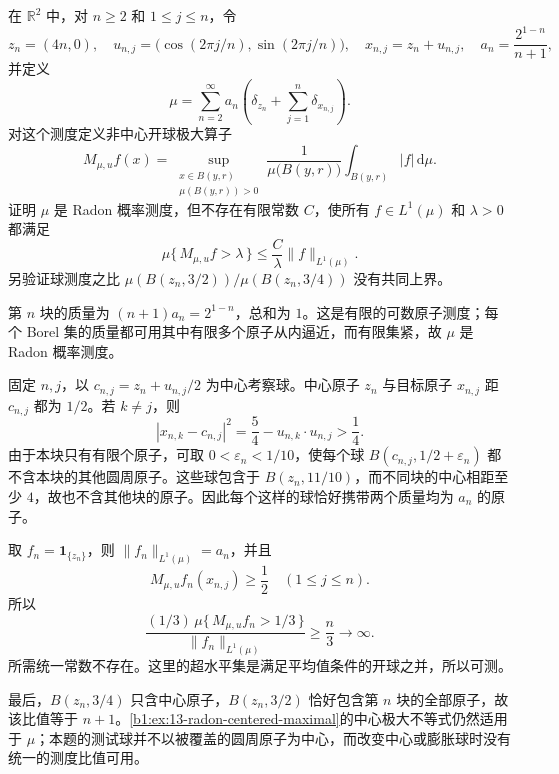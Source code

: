\begin{optionalexercise}\label{b1:ex:13-nondoubling-uncentered}
在 \(\mathbb R^2\) 中，对 \(n\ge2\) 和 \(1\le j\le n\)，令
\[
 z_n=(4n,0),\quad
 u_{n,j}=\bigl(\cos(2\pi j/n),\sin(2\pi j/n)\bigr),
 \quad x_{n,j}=z_n+u_{n,j},\quad
 a_n=\frac{2^{1-n}}{n+1},
\]
并定义
\[
 \mu=\sum_{n=2}^{\infty}a_n\left(\delta_{z_n}+\sum_{j=1}^n\delta_{x_{n,j}}\right).
\]
对这个测度定义非中心开球极大算子
\[
 M_{\mu,u}f(x)=\sup_{\substack{x\in B(y,r)\\\mu(B(y,r))>0}}
 \frac1{\mu\bigl(B(y,r)\bigr)}\int_{B(y,r)}|f|\,\mathrm d\mu.
\]
证明 \(\mu\) 是 Radon 概率测度，但不存在有限常数 \(C\)，使所有 \(f\in L^1(\mu)\) 和 \(\lambda>0\) 都满足
\[
 \mu\{\,M_{\mu,u}f>\lambda\,\}\le\frac C\lambda\|f\|_{L^1(\mu)}.
\]
另验证球测度之比 \(\mu(B(z_n,3/2))/\mu(B(z_n,3/4))\) 没有共同上界。
\end{optionalexercise}
\begin{solution}
第 \(n\) 块的质量为 \((n+1)a_n=2^{1-n}\)，总和为 \(1\)。这是有限的可数原子测度；每个 Borel 集的质量都可用其中有限多个原子从内逼近，而有限集紧，故 \(\mu\) 是 Radon 概率测度。

固定 \(n,j\)，以 \(c_{n,j}=z_n+u_{n,j}/2\) 为中心考察球。中心原子 \(z_n\) 与目标原子 \(x_{n,j}\) 距 \(c_{n,j}\) 都为 \(1/2\)。若 \(k\ne j\)，则
\[
 |x_{n,k}-c_{n,j}|^2
 =\frac54-u_{n,k}\cdot u_{n,j}>\frac14.
\]
由于本块只有有限个原子，可取 \(0<\varepsilon_n<1/10\)，使每个球 \(B(c_{n,j},1/2+\varepsilon_n)\) 都不含本块的其他圆周原子。这些球包含于 \(B(z_n,11/10)\)，而不同块的中心相距至少 \(4\)，故也不含其他块的原子。因此每个这样的球恰好携带两个质量均为 \(a_n\) 的原子。

取 \(f_n=\mathbf1_{\{z_n\}}\)，则 \(\|f_n\|_{L^1(\mu)}=a_n\)，并且
\[
 M_{\mu,u}f_n(x_{n,j})\ge\frac12\quad(1\le j\le n).
\]
所以
\[
 \frac{(1/3)\,\mu\{\,M_{\mu,u}f_n>1/3\,\}}
 {\|f_n\|_{L^1(\mu)}}\ge\frac n3\longrightarrow\infty.
\]
所需统一常数不存在。这里的超水平集是满足平均值条件的开球之并，所以可测。

最后，\(B(z_n,3/4)\) 只含中心原子，\(B(z_n,3/2)\) 恰好包含第 \(n\) 块的全部原子，故该比值等于 \(n+1\)。\cref{b1:ex:13-radon-centered-maximal}的中心极大不等式仍然适用于 \(\mu\)；本题的测试球并不以被覆盖的圆周原子为中心，而改变中心或膨胀球时没有统一的测度比值可用。
\end{solution}


